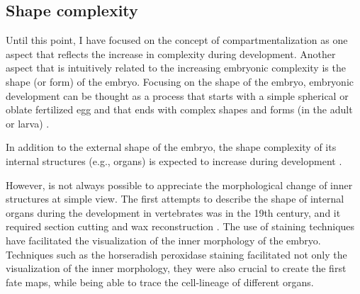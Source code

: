 %

\subsection{Shape complexity}

Until this point, I have focused on the concept of compartmentalization 
as one aspect that reflects the increase in complexity during development.
Another aspect that is intuitively related to the increasing embryonic complexity is the shape (or form) of the embryo. 
Focusing on the shape of the embryo, embryonic development can be thought as a process that starts with a simple spherical or oblate fertilized egg and that ends with complex shapes and forms (in the adult or larva) \citep{Forgacs_Newman2005}. 

In addition to the external shape of the embryo, the shape complexity of its internal structures (e.g., organs) is expected to increase during development \citep{Sharpe2003}. %

However, is not always possible to appreciate the morphological change of inner structures at simple view. The first attempts to describe the shape of internal organs during the development in vertebrates was in the 19th century, and it required  section cutting and wax reconstruction \citep{Hopwood2007}. The use of staining techniques have facilitated the visualization of the inner morphology of the embryo. Techniques such as the horseradish peroxidase staining facilitated not only the visualization of the inner morphology, they were also crucial to create the first fate maps, while being able to trace the cell-lineage of different organs. 


